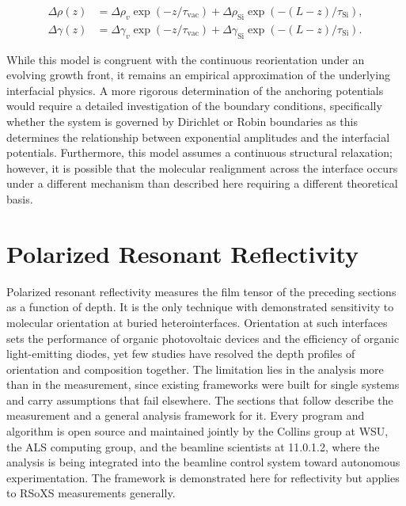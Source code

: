 \begin{align}
  \Delta\rho(z) &= \Delta\rho_{v}\exp\left( - z/\tau_{\mathrm{vac}} \right) + \Delta\rho_{\mathrm{Si}}\exp\left( - (L - z)/\tau_{\mathrm{Si}} \right), \label{eq:profile-rho}\\
  \Delta\gamma(z) &= \Delta\gamma_{v}\exp\left( - z/\tau_{\mathrm{vac}} \right) + \Delta\gamma_{\mathrm{Si}}\exp\left( - (L - z)/\tau_{\mathrm{Si}} \right). \label{eq:profile-gamma}
\end{align}

While this model is congruent with the continuous reorientation under an evolving growth front, it remains an empirical approximation of the underlying interfacial physics. A more rigorous determination of the anchoring potentials would require a detailed investigation of the boundary conditions, specifically whether the system is governed by Dirichlet or Robin boundaries as this determines the relationship between exponential amplitudes and the interfacial potentials. Furthermore, this model assumes a continuous structural relaxation; however, it is possible that the molecular realignment across the interface occurs under a different mechanism than described here requiring a different theoretical basis.

\section{Polarized Resonant Reflectivity}\label{sec:polarized-resonant-reflectivity}

Polarized resonant reflectivity measures the film tensor of the preceding sections as a function of depth. It is the only technique with demonstrated sensitivity to molecular orientation at buried heterointerfaces.\autocite{ferronCompositionDictatesMolecular2023,zotero-item-2198} Orientation at such interfaces sets the performance of organic photovoltaic devices\autocite{tumblestonInfluenceMolecularOrientation2014} and the efficiency of organic light-emitting diodes,\autocite{yokoyamaMolecularOrientationSmallmolecule2011} yet few studies have resolved the depth profiles of orientation and composition together. The limitation lies in the analysis more than in the measurement, since existing frameworks were built for single systems and carry assumptions that fail elsewhere. The sections that follow describe the measurement and a general analysis framework for it. Every program and algorithm is open source and maintained jointly by the Collins group at WSU, the ALS computing group, and the beamline scientists at 11.0.1.2, where the analysis is being integrated into the beamline control system toward autonomous experimentation. The framework is demonstrated here for reflectivity but applies to RSoXS measurements generally.

